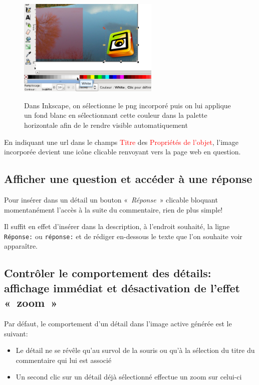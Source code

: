 \documentclass[a4paper,12pt]{report}
\newcommand{\chemin}[1]{\textcolor{red}{#1}}
\begin{document}
\begin{figure}[htp]
 \centering
 \caption{Dans Inkscape, on sélectionne le png incorporé puis on lui applique un fond blanc en sélectionnant 
 cette couleur dans la palette horizontale afin de le rendre visible automatiquement}
 \includegraphics[width=0.6\textwidth]{images/remplissage_blanc}
 \label{remplissage_blanc}
\end{figure}

En indiquant une url dans le champs \chemin{Titre} des \chemin{Propriétés de l'objet}, l'image incorporée
devient une icône clicable renvoyant vers la page web en question.

\subsection{Afficher une question et accéder à une réponse}

Pour insérer dans un détail un bouton «~\textit{Réponse}~» clicable bloquant momentanément l'accès à la suite du commentaire,
rien de plus simple!

Il suffit en effet d'insérer dans la description, à l'endroit souhaité, la ligne\\
\verb|Réponse:| ou \verb|réponse:| et de rédiger en-dessous le texte que l'on souhaite voir apparaître.

\subsection{Contrôler le comportement des détails: affichage immédiat et désactivation
de l'effet «~zoom~»}

Par défaut, le comportement d'un détail dans l'image active générée est le suivant:
\begin{itemize}
 \item Le détail ne se révêle qu'au survol de la souris ou qu'à la sélection du titre du commentaire
 qui lui est associé
 \item Un second clic sur un détail déjà sélectionné effectue un zoom sur celui-ci
\end{itemize}
\end{document}
